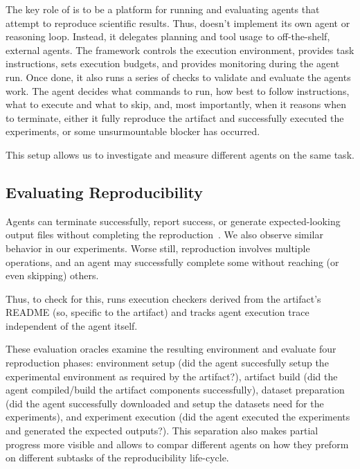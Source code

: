 The key role of \aebench is to be a platform for running 
  and evaluating agents that attempt to reproduce 
  scientific results.
Thus, \aebench doesn't implement its own agent or 
  reasoning loop.
Instead, it delegates planning and tool usage to 
  off-the-shelf, external agents.
The framework controls the execution environment, provides task 
  instructions, sets execution budgets, and provides monitoring 
  during the agent run.
Once done, it also runs a series of checks to validate and evaluate 
  the agents work.
The agent decides what commands to run, how best to follow instructions, 
  what to execute and what to skip, and, most importantly, when it 
  reasons when to terminate, either it fully reproduce the artifact 
  and successfully executed the experiments, or some unsurmountable blocker 
  has occurred.

This setup allows us to investigate and measure different agents on 
  the same task.


\subsection{Evaluating Reproducibility}


Agents can terminate successfully, report success, 
  or generate expected-looking output files without 
  completing the reproduction~\cite{yang-blog26, wu-arxiv26, baek-ase26}.
We also observe similar behavior in our experiments.
Worse still, reproduction involves multiple 
  operations, and an agent may successfully complete 
  some without reaching (or even skipping) others.

Thus, to check for this, \aebench runs execution checkers 
  derived from the artifact's README (so, specific 
  to the artifact) and tracks agent execution trace 
  independent of the agent itself.

These evaluation oracles examine the resulting environment 
  and evaluate four reproduction phases: 
  environment setup (did the agent succesfully setup the 
  experimental environment as required by the artifact?), 
  artifact build (did the agent compiled/build the artifact 
  components successfully), dataset preparation (did the agent 
  successfully downloaded and setup the datasets need for the experiments), 
  and experiment execution (did the agent executed the experiments and 
  generated the expected outputs?).
This separation also makes partial progress more visible and 
  allows to compar different agents on how they preform on 
  different subtasks of the reproducibility life-cycle.
~

